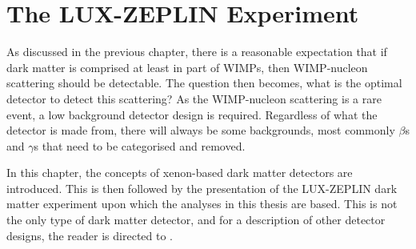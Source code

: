 \chapter{The LUX-ZEPLIN Experiment}
\label{sec:lz_detector_chapter}
\par
As discussed in the previous chapter, there is a reasonable expectation that if dark matter is comprised at least in part of WIMPs, then WIMP-nucleon scattering should be detectable.
The question then becomes, what is the optimal detector to detect this scattering?
As the WIMP-nucleon scattering is a rare event, a low background detector design is required.
Regardless of what the detector is made from, there will always be some backgrounds, most commonly $\beta$s and $\gamma$s that need to be categorised and removed.
\par
In this chapter, the concepts of xenon-based dark matter detectors are introduced.
This is then followed by the presentation of the LUX-ZEPLIN dark matter experiment upon which the analyses in this thesis are based.
This is not the only type of dark matter detector, and for a description of other detector designs, the reader is directed to \cite{direct_detector_designs_ref}.





%